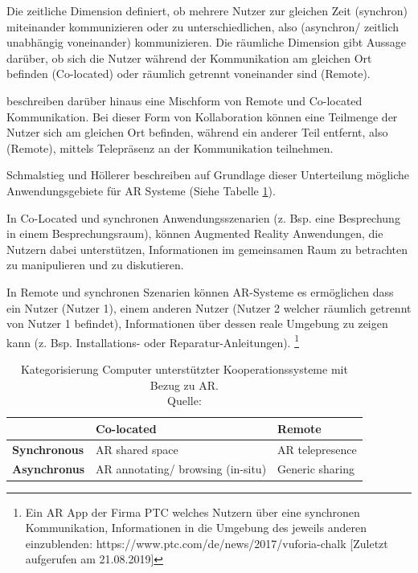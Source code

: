 Die zeitliche Dimension definiert, ob mehrere Nutzer zur gleichen Zeit (synchron) miteinander kommunizieren 
oder zu unterschiedlichen, also (asynchron/ zeitlich unabhängig voneinander) kommunizieren. Die räumliche Dimension 
gibt Aussage darüber, ob sich die Nutzer während der Kommunikation am gleichen Ort befinden (Co-located) oder räumlich getrennt voneinander sind (Remote). 

\cite[S.~188]{ElSayedNevenA.M.BruceH.ThomasRossT.Smith2015} beschreiben darüber hinaus eine Mischform von Remote und Co-located Kommunikation. 
Bei dieser Form von Kollaboration können eine Teilmenge der Nutzer sich am gleichen Ort befinden, während ein anderer Teil entfernt, 
also (Remote), mittels Telepräsenz an der Kommunikation teilnehmen. 

Schmalstieg und Höllerer \cite[S.~362]{DieterSchmalstieg2016} beschreiben auf Grundlage dieser Unterteilung mögliche 
Anwendungsgebiete für AR Systeme (Siehe Tabelle \ref{tab:categorycscw}).

\cite[S.~362]{DieterSchmalstieg2016} In Co-Located und synchronen Anwendungsszenarien (z. Bsp. eine Besprechung in einem Besprechungsraum), können 
Augmented Reality Anwendungen, die Nutzern dabei unterstützen, Informationen im gemeinsamen Raum zu betrachten zu manipulieren und zu diskutieren. 

In Remote und synchronen Szenarien können AR-Systeme es ermöglichen dass ein Nutzer (Nutzer 1), einem anderen Nutzer (Nutzer 2 welcher räumlich getrennt von Nutzer 1 befindet), 
Informationen über dessen reale Umgebung zu zeigen kann (z. Bsp. Installations- oder Reparatur-Anleitungen). \footnote{Ein AR App der Firma PTC welches Nutzern über eine synchronen Kommunikation, Informationen in die Umgebung des jeweils anderen einzublenden: https://www.ptc.com/de/news/2017/vuforia-chalk [Zuletzt aufgerufen am 21.08.2019]} 

\begin{table}[htbp]
\caption{Kategorisierung Computer unterstützter Kooperationssysteme mit Bezug zu AR. \\Quelle: \cite[S.~362]{DieterSchmalstieg2016}}
	\begin{center}
		\begin{tabular}{|l|ll|}
		\hline
		 & \textbf{Co-located} & \textbf{Remote}\\
		\hline
		\textbf{Synchronous} &  AR shared space & AR telepresence \\
		\textbf{Asynchronus} & AR annotating/ browsing (in-situ) & Generic sharing\\
		\hline
		\end{tabular}
	\end{center}
	\label{tab:categorycscw}
\end{table}

